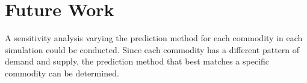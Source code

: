 \section{Future Work}
A sensitivity analysis varying the prediction method for 
each commodity in each simulation could be conducted. 
Since each commodity has a different pattern of demand and 
supply, the prediction method that best matches a specific 
commodity can be determined. 